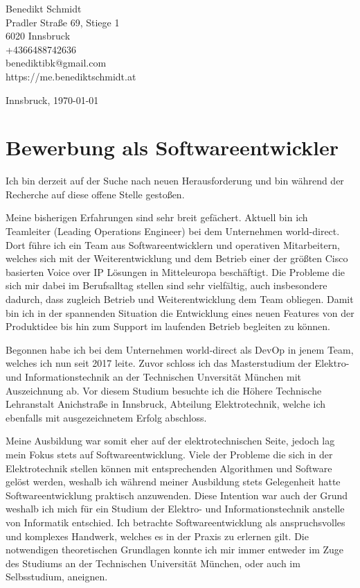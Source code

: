 


\begin{flushleft}
Benedikt Schmidt \\
Pradler Straße 69, Stiege 1 \\
6020 Innsbruck \\
+4366488742636 \\
benediktibk@gmail.com \\
https://me.benediktschmidt.at \\
\end{flushleft}
\begin{flushright}
Innsbruck, \today
\end{flushright}

\section*{Bewerbung als Softwareentwickler}
Ich bin derzeit auf der Suche nach neuen Herausforderung und bin während der Recherche auf diese offene Stelle gestoßen. \par
Meine bisherigen Erfahrungen sind sehr breit gefächert. Aktuell bin ich Teamleiter (Leading Operations Engineer) bei dem Unternehmen world-direct. Dort führe ich ein Team aus Softwareentwicklern und operativen Mitarbeitern, welches sich mit der Weiterentwicklung und dem Betrieb einer der größten Cisco basierten Voice over IP Lösungen in Mitteleuropa beschäftigt. Die Probleme die sich mir dabei im Berufsalltag stellen sind sehr vielfältig, auch insbesondere dadurch, dass zugleich Betrieb und Weiterentwicklung dem Team obliegen. Damit bin ich in der spannenden Situation die Entwicklung eines neuen Features von der Produktidee bis hin zum Support im laufenden Betrieb begleiten zu können. \par
Begonnen habe ich bei dem Unternehmen world-direct als DevOp in jenem Team, welches ich nun seit 2017 leite. Zuvor schloss ich das Masterstudium der Elektro- und Informationstechnik an der Technischen Unversität München mit Auszeichnung ab. Vor diesem Studium besuchte ich die Höhere Technische Lehranstalt Anichstraße in Innsbruck, Abteilung Elektrotechnik, welche ich ebenfalls mit ausgezeichnetem Erfolg abschloss. \par
Meine Ausbildung war somit eher auf der elektrotechnischen Seite, jedoch lag mein Fokus stets auf Softwareentwicklung. Viele der Probleme die sich in der Elektrotechnik stellen können mit entsprechenden Algorithmen und Software gelöst werden, weshalb ich während meiner Ausbildung stets Gelegenheit hatte Softwareentwicklung praktisch anzuwenden. Diese Intention war auch der Grund weshalb ich mich für ein Studium der Elektro- und Informationstechnik anstelle von Informatik entschied. Ich betrachte Softwareentwicklung als anspruchsvolles und komplexes Handwerk, welches es in der Praxis zu erlernen gilt. Die notwendigen theoretischen Grundlagen konnte ich mir immer entweder im Zuge des Studiums an der Technischen Universität München, oder auch im Selbsstudium, aneignen. \par
